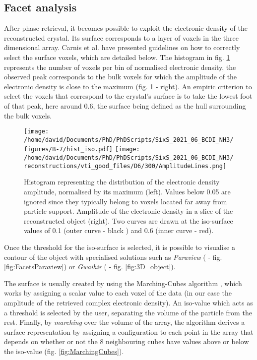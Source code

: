 \subsection{Facet analysis} \label{sec:FacetAnalysis}

After phase retrieval, it becomes possible to exploit the electronic density of the reconstructed crystal.
Its surface corresponds to a layer of voxels in the three dimensional array.
Carnis et al. \parencite*{Carnis2019} have presented guidelines on how to correctly select the surface voxels, which are detailed below.
The histogram in fig. \ref{fig:histo} represents the number of voxels per bin of normalised electronic density, the observed peak corresponds to the bulk voxels for which the amplitude of the electronic density is close to the maximum (fig. \ref{fig:histo} - right).
An empiric criterion to select the voxels that correspond to the crystal's surface is to take the lowest foot of that peak, here around \num{0.6}, the surface being defined as the hull surrounding the bulk voxels.

\begin{figure}[!htb]
   \centering
   \texttt{[image: /home/david/Documents/PhD/PhDScripts/SixS\_2021\_06\_BCDI\_NH3/figures/B-7/hist\_iso.pdf]}
   \texttt{[image: /home/david/Documents/PhD/PhDScripts/SixS\_2021\_06\_BCDI\_NH3/reconstructions/vti\_good\_files/D6/300/AmplitudeLines.png]}
   \caption{
   Histogram representing the distribution of the electronic density amplitude, normalised by its maximum (left).
   Values below 0.05 are ignored since they typically belong to voxels located far away from particle support.
   Amplitude of the electronic density in a slice of the reconstructed object (right).
   Two curves are drawn at the iso-surface values of \num{0.1} (outer curve - black ) and \num{0.6} (inner curve - red).
   }
   \label{fig:histo}
\end{figure}

Once the threshold for the iso-surface is selected, it is possible to visualise a contour of the object with specialised solutions such as \textit{Paraview} (\cite{Ahrens2001} - fig. \ref{fig:FacetsParaview}) or \textit{Gwaihir} (\cite{Simonne2022} - fig. \ref{fig:3D_object}).

The surface is usually created by using the Marching-Cubes algorithm \parencite{Lorensen1987}, which works by assigning a scalar value to each voxel of the data (in our case the amplitude of the retrieved complex electronic density).
An iso-value which acts as a threshold is selected by the user, separating the volume of the particle from the rest.
Finally, by \textit{marching} over the volume of the array, the algorithm derives a surface representation by assigning a configuration to each point in the array that depends on whether or not the 8 neighbouring cubes have values above or below the iso-value (fig. \ref{fig:MarchingCubes}).

